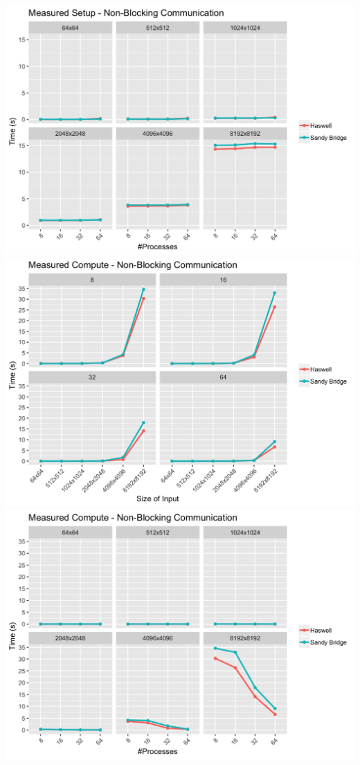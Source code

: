\documentclass[10pt, letterpaper, twoside]{article}
\begin{document}
\begin{titlepage}
\begin{enumerate}
\includegraphics[scale = 0.18]{P2P_Measured-Setup_InputSize.png}
\vspace{5mm}
\includegraphics[scale = 0.18]{P2P_Measured-Compute_Processes.png}
\includegraphics[scale = 0.18]{P2P_Measured-Compute_InputSize.png}

\end{enumerate}
\end{titlepage}
\end{document}
